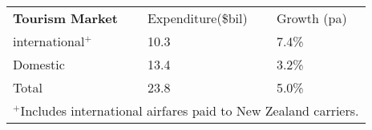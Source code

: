 \begin{tabular}[t]{p{4.2cm}>{\hfill}p{1.9cm}>{\hfill}p{1.4cm}}
 \textbf{Tourism Market} & Expenditure(\$bil) & Growth (pa) \\ 
 international$^+$ & 10.3 & 7.4\% \\ 
  Domestic & 13.4 & 3.2\% \\ 
  Total & 23.8 & 5.0\% \\ 
  \multicolumn{3}{p{7.5cm}}{$^+$Includes international airfares paid to New Zealand carriers.}\ 
\end{tabular}
